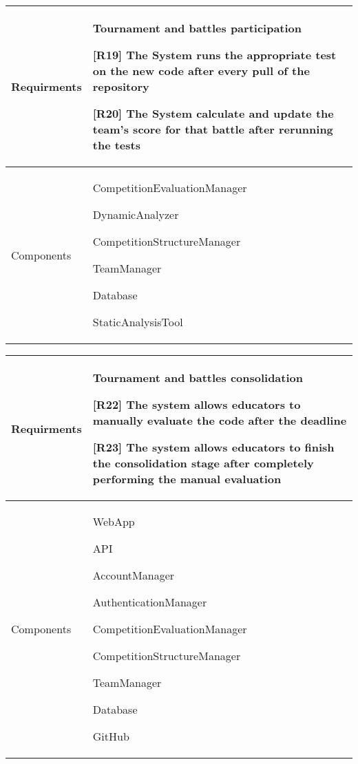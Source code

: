     \begin{table}[!h]
        \centering
        \begin{tabular}{ | m{6em} | m{30em} |} 
            \hline
             Requirments&\textbf{Tournament and battles participation}
             
             
             [R19] The System runs the appropriate test on the new code after every pull of the repository
    
    
    [R20] The System calculate and update the team's score for that battle after rerunning the tests
    
             
    \\
            \hline
             Components& 
             CompetitionEvaluationManager

             DynamicAnalyzer
             
             
             CompetitionStructureManager
             
             
             TeamManager
             
             Database
             
             StaticAnalysisTool\\
             \hline
        \end{tabular}
        \label{tab:my_label}
    \end{table}

    
      \begin{table}[!h]
        \centering
        \begin{tabular}{ | m{6em} | m{30em} |} 
            \hline
             Requirments& \textbf{Tournament and battles consolidation}
             
             [R22] The system allows educators to manually evaluate the code after the deadline
             
    [R23] The system  allows educators to finish the consolidation stage after completely performing the manual evaluation
    
             
    
             
    \\
            \hline
             Components& WebApp

             API
             
             
             AccountManager
             
             AuthenticationManager
             
             CompetitionEvaluationManager
             
             
             CompetitionStructureManager
             
             
             TeamManager
             
             Database

             GitHub\\
             \hline
        \end{tabular}
        \label{tab:my_label}
    \end{table}

